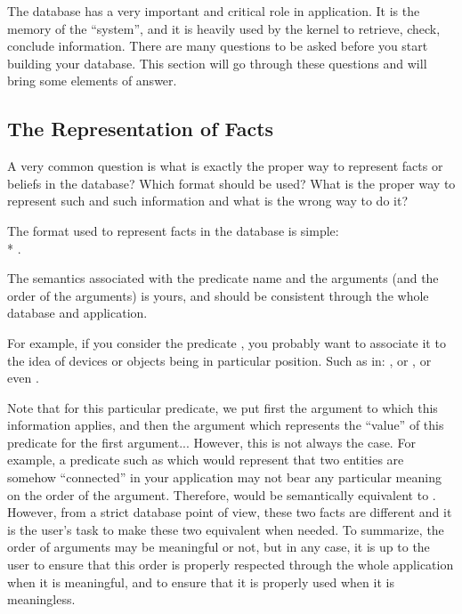 The database has a very important and critical role in \aCOPRS{}
application. It is the memory of the ``system'', and it is heavily used
by the kernel to retrieve, check, conclude information. There are many
questions to be asked before you start building your database. This
section will go through these questions and will bring some elements of
answer.



\subsection{The Representation of Facts}

A very common question is what is exactly the proper way to represent
facts or beliefs in the database? Which format should be used? What is
the proper way to represent such and such information and what is the
wrong way to do it?

The format used to represent facts in the database is simple: \\*
.

The semantics associated with the predicate name and the arguments (and
the order of the arguments) is yours, and should be consistent through
the whole database and application.

For example, if you consider the predicate , you probably
want to associate it to the idea of devices or objects being in
particular position. Such as in: , or
, or even .

Note that for this particular predicate, we put first the argument to which
this information applies, and then the argument which represents the ``value''
of this predicate for the first argument... However, this is not always
the case. For example, a predicate such as  which would
represent that two entities are somehow ``connected'' in your application
may not bear any particular meaning on the order of the argument.
Therefore,  would be semantically equivalent to
. However, from a strict database point of view,
these two facts are different and it is the user's task to make these two
equivalent when needed. To summarize, the order of arguments may be
meaningful or not, but in any case, it is up to the user to ensure that
this order is properly respected through the whole application when it is
meaningful, and to ensure that it is properly used when it is meaningless.

